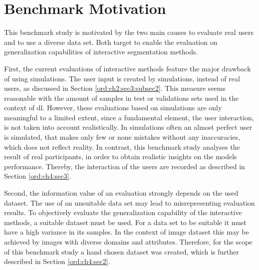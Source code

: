 
\section{Benchmark Motivation}\label{ord:ch4:sec1}

This benchmark study is motivated by the two main causes to evaluate real users and to use a diverse data set.
Both target to enable the evaluation on generalization capabilities of interactive segmentation methods.

First, the current evaluations of interactive methods feature the major drawback of using simulations.
The user input is created by simulations, instead of real users, as discussed in Section \ref{ord:ch2:sec3:subsec2}.
This measure seems reasonable with the amount of samples in test or validations sets used in the context of \gls{dl}.
However, these evaluations based on simulations are only meaningful to a limited extent, since a fundamental element, the user interaction, is not taken into account realistically.
In simulations often an almost perfect user is simulated, that makes only few or none mistakes without any inaccuracies, which does not reflect reality.
In contrast, this benchmark study analyses the result of real participants, in order to obtain realistic insights on the models performance.
Thereby, the interaction of the users are recorded as described in Section \ref{ord:ch4:sec3}.


Second, the information value of an evaluation strongly depends on the used dataset.
The use of an unsuitable data set may lead to misrepresenting evaluation results.
To objectively evaluate the generalization capability of the interactive methods, a suitable dataset must be used.
For a data set to be suitable it must have a high variance in its samples.
In the context of image dataset this may be achieved by images with diverse domains and attributes.
Therefore, for the scope of this benchmark study a hand chosen dataset was created, which is further described in Section \ref{ord:ch4:sec2}.

